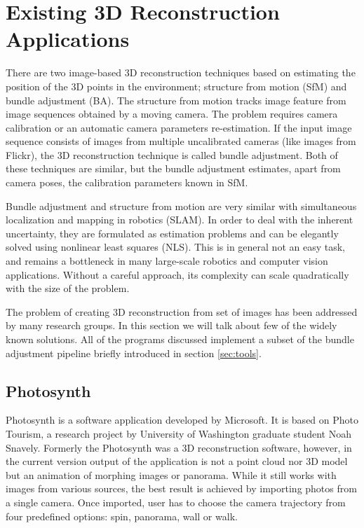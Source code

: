 \section{Existing 3D Reconstruction Applications}
\label{sec:existing_3D_reconstruction_solutions}
There are two image-based 3D reconstruction techniques based on estimating the position of the 3D points in the environment; structure from motion (SfM) and bundle adjustment (BA). The structure from motion tracks image feature from image sequences obtained by a moving camera. The problem requires camera calibration or an automatic camera parameters re-estimation. If the input image sequence consists of images from multiple uncalibrated cameras (like images from Flickr), the 3D reconstruction technique is called bundle adjustment. Both of these techniques are similar, but the bundle adjustment estimates, apart from camera poses, the calibration parameters known in SfM.

Bundle adjustment and structure from motion are very similar with simultaneous localization and mapping in robotics (SLAM). In order to deal with the inherent uncertainty, they are formulated as estimation problems and can be elegantly solved using nonlinear least squares (NLS). This is in general not an easy task, and remains a bottleneck in many large-scale robotics and computer vision applications. Without a careful approach, its complexity can scale quadratically with the size of the problem.

The problem of creating 3D reconstruction from set of images has been addressed by many research groups. In this section we will talk about few of the widely known solutions. All of the programs discussed implement a subset of the bundle adjustment pipeline briefly introduced in section \ref{sec:tools}.

\subsection*{Photosynth}
Photosynth is a software application developed by Microsoft. It is based on Photo Tourism, a research project by University of Washington graduate student Noah Snavely. Formerly the Photosynth was a 3D reconstruction software, however, in the current version output of the application is not a point cloud nor 3D model but an animation of morphing images or panorama. While it still works with images from various sources, the best result is achieved by importing photos from a single camera. Once imported, user has to choose the camera trajectory from four predefined options: spin, panorama, wall or walk. 

